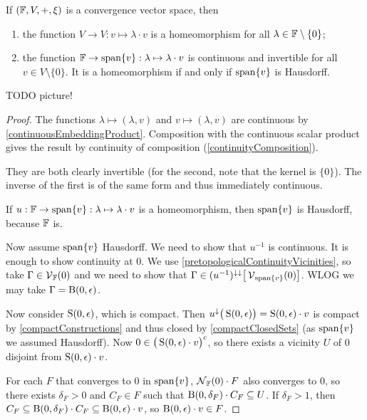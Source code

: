 \begin{lemma} \label{continuityLemmaVectorConvergence}
If $\sSet{\F,V,+, \xi}$ is a convergence vector space, then
\begin{enumerate}
\item the function $V \to V: v \mapsto \lambda\cdot v$ is a homeomorphism for all $\lambda\in \mathbb{F}\setminus\{0\}$;
\item the function $\mathbb{F} \to \operatorname{span}\{v\}: \lambda \mapsto \lambda\cdot v$ is continuous and invertible for all $v\in V\setminus\{0\}$. It is a homeomorphism \textup{if and only if} $\operatorname{span}\{v\}$ is Hausdorff.
\end{enumerate}
\end{lemma}
TODO picture!
\begin{proof}
The functions $\lambda \mapsto (\lambda, v)$ and $v \mapsto (\lambda, v)$ are continuous by \ref{continuousEmbeddingProduct}. Composition with the continuous scalar product gives the result by continuity of composition (\ref{continuityComposition}).

They are both clearly invertible (for the second, note that the kernel is $\{0\}$). The inverse of the first is of the same form and thus immediately continuous.

If $u: \mathbb{F} \to \operatorname{span}\{v\}: \lambda \mapsto \lambda\cdot v$ is a homeomorphism, then $\operatorname{span}\{v\}$ is Hausdorff, because $\mathbb{F}$ is.

Now assume $\operatorname{span}\{v\}$ Hausdorff. We need to show that $u^{-1}$ is continuous. It is enough to show continuity at $0$. We use \ref{pretopologicalContinuityVicinities}, so take $\Gamma \in \operatorname{\mathcal{V}}_{\mathbb{F}}(0)$ and we need to show that $\Gamma \in (u^{-1})^{\downarrow\downarrow}\big[\operatorname{\mathcal{V}}_{\operatorname{span}\{v\}}(0)\big]$. WLOG we may take $\Gamma = \operatorname{B}(0, \epsilon)$.

Now consider $\operatorname{S}(0,\epsilon)$, which is compact. Then $u^{\downarrow}\big(\operatorname{S}(0,\epsilon)\big) = \operatorname{S}(0,\epsilon)\cdot v$ is compact by \ref{compactConstructions} and thus closed by \ref{compactClosedSets} (as $\operatorname{span}\{v\}$ we assumed Hausdorff). Now $0 \in \big(\operatorname{S}(0,\epsilon)\cdot v\big)^c$, so there exists a vicinity $U$ of $0$ disjoint from $\operatorname{S}(0,\epsilon)\cdot v$.

For each $F$ that converges to $0$ in $\operatorname{span}\{v\}$, $\operatorname{\mathcal{N}}_{\mathbb{F}}(0)\cdot F$ also converges to $0$, so there exists $\delta_F>0$ and $C_F\in F$ such that $\operatorname{B}(0, \delta_F)\cdot C_F \subseteq U$. If $\delta_F > 1$, then $C_F \subseteq \operatorname{B}(0, \delta_F)\cdot C_F \subseteq \operatorname{B}(0,\epsilon)\cdot v$, so $\operatorname{B}(0,\epsilon)\cdot v\in F$.


\end{proof}
